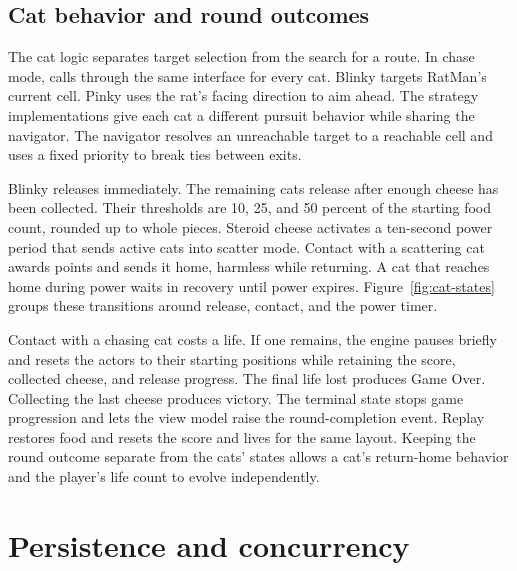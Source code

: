 
\clearpage
\subsection{Cat behavior and round outcomes}

The cat logic separates target selection from the search for a route. In chase mode,  calls  through the same interface for every cat. Blinky targets RatMan's current cell. Pinky uses the rat's facing direction to aim ahead. The strategy implementations give each cat a different pursuit behavior while sharing the navigator. The navigator resolves an unreachable target to a reachable cell and uses a fixed priority to break ties between exits.

Blinky releases immediately. The remaining cats release after enough cheese has been collected. Their thresholds are 10, 25, and 50 percent of the starting food count, rounded up to whole pieces. Steroid cheese activates a ten-second power period that sends active cats into scatter mode. Contact with a scattering cat awards points and sends it home, harmless while returning. A cat that reaches home during power waits in recovery until power expires. Figure~\ref{fig:cat-states} groups these transitions around release, contact, and the power timer.

Contact with a chasing cat costs a life. If one remains, the engine pauses briefly and resets the actors to their starting positions while retaining the score, collected cheese, and release progress. The final life lost produces Game Over. Collecting the last cheese produces victory. The terminal state stops game progression and lets the view model raise the round-completion event. Replay restores food and resets the score and lives for the same layout. Keeping the round outcome separate from the cats' states allows a cat's return-home behavior and the player's life count to evolve independently.


\clearpage
\section{Persistence and concurrency}

